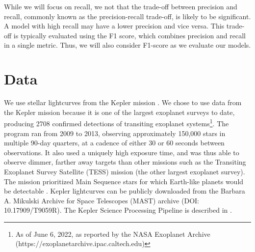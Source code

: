 \documentclass{article}
\begin{document}
While we will focus on recall, we not that the trade-off between precision and recall, commonly known as the precision-recall trade-off, is likely to be significant. A model with high recall may have a lower precision and vice versa. This trade-off is typically evaluated using the F1 score, which combines precision and recall in a single metric. Thus, we will also consider F1-score as we evaluate our models.


\section{Data}
\label{Data}

We use stellar lightcurves from the Kepler mission \citep{Ricker2015}. We chose to use data from the Kepler mission because it is one of the largest exoplanet surveys to date,  producing 2708 confirmed detections of transiting exoplanet systems\footnote{As of June 6, 2022, as reported by the NASA Exoplanet Archive (https://exoplanetarchive.ipac.caltech.edu)}. The program ran from 2009 to 2013, observing approximately 150,000 stars in multiple 90-day quarters, at a cadence of either 30 or 60 seconds between observations.  It also used a uniquely high exposure time, and was thus able to observe dimmer, farther away targets than other missions such as the Transiting Exoplanet Survey Satellite (TESS) mission (the other largest exoplanet survey). The mission prioritized Main Sequence stars for which Earth-like planets would be detectable \citep{Batalha_2010}. Kepler lightcurves can be publicly downloaded from the Barbara A. Mikulski Archive for Space Telescopes (MAST) archive (DOI: 10.17909/T9059R). The Kepler Science Processing Pipeline is described in \cite{Jenkins2010}. 
\end{document}
